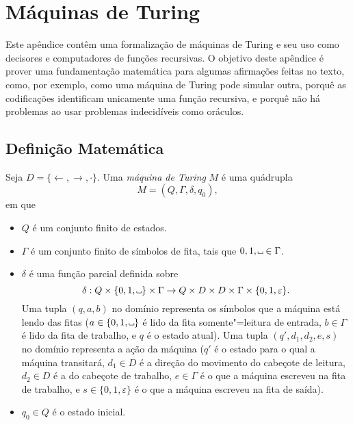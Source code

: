 \chapter{Máquinas de Turing}
\label{app:turing_machines}

\newcommand\B{\tikz{\draw (0, 0.5ex) -- (0, 0) -- (0.5em, 0) -- (0.5em, 0.5ex);}}

Este apêndice contêm uma formalização de máquinas de Turing
e seu uso como decisores e computadores de funções recursivas.
O objetivo deste apêndice é prover uma fundamentação matemática
para algumas afirmações feitas no texto,
como, por exemplo,
como uma máquina de Turing pode simular outra,
porquê as codificações identificam unicamente uma função recursiva,
e porquê não há problemas ao usar problemas indecidíveis como oráculos.

\section{Definição Matemática}

\begin{definition}
    Seja $D = \{\leftarrow, \rightarrow, \cdot\}$.
    Uma \emph{máquina de Turing} $M$ é uma quádrupla
    \begin{equation*}
        M = (Q, \Gamma, \delta, q_0),
    \end{equation*}
    em que
    \begin{itemize}
        \setlength{\labelsep}{1ex}
        \item $Q$ é um conjunto finito de estados.
        \item $\Gamma$ é um conjunto finito de símbolos de fita,
            tais que $0, 1, \B \in \Gamma$.
        \item $\delta$ é uma função parcial definida sobre
            \begin{equation*}
                \delta: Q \times \{0, 1, \B\} \times \Gamma
                    \to Q \times D \times D \times \Gamma \times \{0, 1, \varepsilon\}.
            \end{equation*}
            Uma tupla $(q, a, b)$ no domínio
            representa os símbolos que a máquina está lendo das fitas
            ($a \in \{0, 1, \B\}$ é lido da fita somente"=leitura de entrada,
            $b \in \Gamma$ é lido da fita de trabalho,
            e $q$ é o estado atual).
            Uma tupla $(q', d_1, d_2, e, s)$ no domínio
            representa a ação da máquina
            ($q'$ é o estado para o qual a máquina transitará,
            $d_1 \in D$ é a direção do movimento do cabeçote de leitura,
            $d_2 \in D$ é a do cabeçote de trabalho,
            $e \in \Gamma$ é o que a máquina escreveu na fita de trabalho,
            e $s \in \{0, 1, \varepsilon\}$ é o que a máquina escreveu
            na fita de saída).
        \item $q_0 \in Q$ é o estado inicial.
    \end{itemize}
\end{definition}

